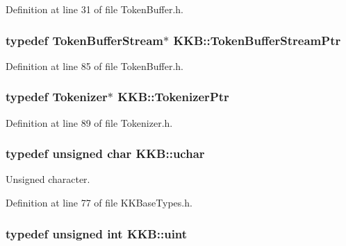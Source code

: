Definition at line 31 of file Token\+Buffer.\+h.

\subsubsection[{\texorpdfstring{Token\+Buffer\+Stream\+Ptr}{TokenBufferStreamPtr}}]{\setlength{\rightskip}{0pt plus 5cm}typedef {\bf Token\+Buffer\+Stream}$\ast$ {\bf K\+K\+B\+::\+Token\+Buffer\+Stream\+Ptr}}\hypertarget{namespace_k_k_b_a7b9e0f7d3915b925553f0dd6afcfcaf6}{}\label{namespace_k_k_b_a7b9e0f7d3915b925553f0dd6afcfcaf6}


Definition at line 85 of file Token\+Buffer.\+h.

\subsubsection[{\texorpdfstring{Tokenizer\+Ptr}{TokenizerPtr}}]{\setlength{\rightskip}{0pt plus 5cm}typedef {\bf Tokenizer}$\ast$ {\bf K\+K\+B\+::\+Tokenizer\+Ptr}}\hypertarget{namespace_k_k_b_a73e00654d0cf80b7f86c64d9be4b8aa8}{}\label{namespace_k_k_b_a73e00654d0cf80b7f86c64d9be4b8aa8}


Definition at line 89 of file Tokenizer.\+h.

\subsubsection[{\texorpdfstring{uchar}{uchar}}]{\setlength{\rightskip}{0pt plus 5cm}typedef unsigned char {\bf K\+K\+B\+::uchar}}\hypertarget{namespace_k_k_b_ace9969169bf514f9ee6185186949cdf7}{}\label{namespace_k_k_b_ace9969169bf514f9ee6185186949cdf7}


Unsigned character. 



Definition at line 77 of file K\+K\+Base\+Types.\+h.

\subsubsection[{\texorpdfstring{uint}{uint}}]{\setlength{\rightskip}{0pt plus 5cm}typedef unsigned int {\bf K\+K\+B\+::uint}}\hypertarget{namespace_k_k_b_ab8557ae1b1f2361659d82a890e2f8014}{}\label{namespace_k_k_b_ab8557ae1b1f2361659d82a890e2f8014}


